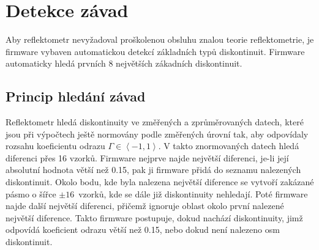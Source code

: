 \chapter{Detekce závad}
Aby reflektometr nevyžadoval proškolenou obsluhu znalou teorie reflektometrie, je firmware vybaven automatickou detekcí základních typů diskontinuit. Firmware automaticky hledá prvních 8 největších zákadních diskontinuit.

\section{Princip hledání závad}
Reflektometr hledá diskontinuity ve změřených a zprůměrovaných datech, které jsou při výpočtech ještě normovány podle změřených úrovní tak, aby odpovídaly rozsahu koeficientu odrazu $\Gamma \in \left\langle -1, 1 \right\rangle$. V takto znormovaných datech hledá diferenci přes 16 vzorků. Firmware nejprve najde největší diferenci, je-li její absolutní hodnota větší než \SI{0.15}{}, pak ji firmware přidá do seznamu nalezených diskontinuit. Okolo bodu, kde byla nalezena největší diference se vytvoří zakázané pásmo o šířce $\pm 16$~vzorků, kde se dále již diskontinuity nehledají. Poté firmware najde další největší diferenci, přičemž ignoruje oblast okolo první nalezené největší diference. Takto firmware postupuje, dokud nachází diskontinuity, jimž odpovídá koeficient odrazu větší než \SI{0.15}{}, nebo dokud není nalezeno osm diskontinuit.

